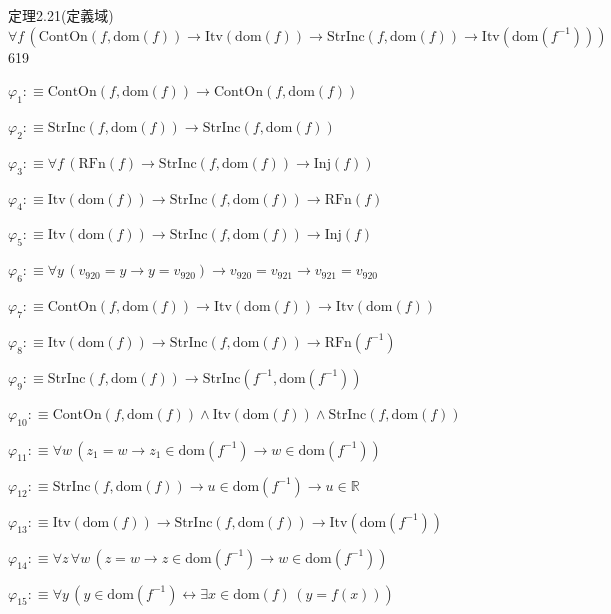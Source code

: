 \begin{fullproof}{定理2.21(定義域)}{$\forall f\,(\mathrm{ContOn}(f,\mathrm{dom}(f)) \to \mathrm{Itv}(\mathrm{dom}(f)) \to \mathrm{StrInc}(f,\mathrm{dom}(f)) \to \mathrm{Itv}(\mathrm{dom}(f^{-1})))$}{619}
\begin{ptree}
\noLine
{}
\end{ptree}
\begin{abbrevlist}
\item $\varphi_{1} :\equiv \mathrm{ContOn}(f,\mathrm{dom}(f)) \to \mathrm{ContOn}(f,\mathrm{dom}(f))$
\item $\varphi_{2} :\equiv \mathrm{StrInc}(f,\mathrm{dom}(f)) \to \mathrm{StrInc}(f,\mathrm{dom}(f))$
\item $\varphi_{3} :\equiv \forall f\,(\mathrm{RFn}(f) \to \mathrm{StrInc}(f,\mathrm{dom}(f)) \to \mathrm{Inj}(f))$
\item $\varphi_{4} :\equiv \mathrm{Itv}(\mathrm{dom}(f)) \to \mathrm{StrInc}(f,\mathrm{dom}(f)) \to \mathrm{RFn}(f)$
\item $\varphi_{5} :\equiv \mathrm{Itv}(\mathrm{dom}(f)) \to \mathrm{StrInc}(f,\mathrm{dom}(f)) \to \mathrm{Inj}(f)$
\item $\varphi_{6} :\equiv \forall y\,(v_{920} = y \to y = v_{920}) \to v_{920} = v_{921} \to v_{921} = v_{920}$
\item $\varphi_{7} :\equiv \mathrm{ContOn}(f,\mathrm{dom}(f)) \to \mathrm{Itv}(\mathrm{dom}(f)) \to \mathrm{Itv}(\mathrm{dom}(f))$
\item $\varphi_{8} :\equiv \mathrm{Itv}(\mathrm{dom}(f)) \to \mathrm{StrInc}(f,\mathrm{dom}(f)) \to \mathrm{RFn}(f^{-1})$
\item $\varphi_{9} :\equiv \mathrm{StrInc}(f,\mathrm{dom}(f)) \to \mathrm{StrInc}(f^{-1},\mathrm{dom}(f^{-1}))$
\item $\varphi_{10} :\equiv \mathrm{ContOn}(f,\mathrm{dom}(f)) \land \mathrm{Itv}(\mathrm{dom}(f)) \land \mathrm{StrInc}(f,\mathrm{dom}(f))$
\item $\varphi_{11} :\equiv \forall w\,(z_{1} = w \to z_{1} \in \mathrm{dom}(f^{-1}) \to w \in \mathrm{dom}(f^{-1}))$
\item $\varphi_{12} :\equiv \mathrm{StrInc}(f,\mathrm{dom}(f)) \to u \in \mathrm{dom}(f^{-1}) \to u \in \mathbb{R}$
\item $\varphi_{13} :\equiv \mathrm{Itv}(\mathrm{dom}(f)) \to \mathrm{StrInc}(f,\mathrm{dom}(f)) \to \mathrm{Itv}(\mathrm{dom}(f^{-1}))$
\item $\varphi_{14} :\equiv \forall z\,\forall w\,(z = w \to z \in \mathrm{dom}(f^{-1}) \to w \in \mathrm{dom}(f^{-1}))$
\item $\varphi_{15} :\equiv \forall y\,(y \in \mathrm{dom}(f^{-1}) \leftrightarrow \exists x \in \mathrm{dom}(f)\,(y = f(x)))$

\end{abbrevlist}
\end{fullproof}
